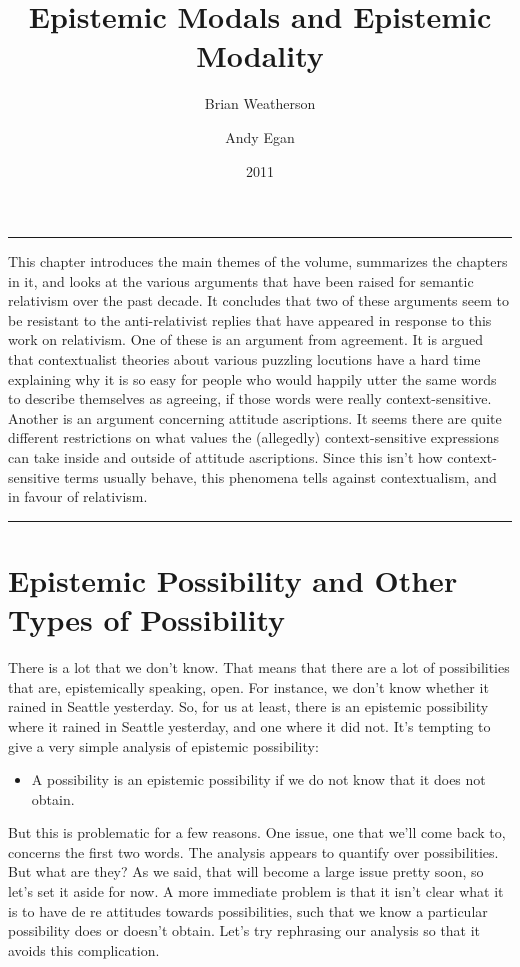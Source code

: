 \documentclass[
  10pt,
  letterpaper,
  DIV=11,
  numbers=noendperiod,
  twoside]{scrartcl}
\title{Epistemic Modals and Epistemic Modality}
\author{Brian Weatherson \and Andy Egan}
\date{2011}
\providecommand{\tightlist}{%
  \setlength{\itemsep}{0pt}\setlength{\parskip}{0pt}}\usepackage{longtable,booktabs,array}
\renewenvironment{abstract}
 {\vspace{-1.25cm}
 \quotation\small\noindent\rule{\linewidth}{.5pt}\par\smallskip
 \noindent }
 {\par\noindent\rule{\linewidth}{.5pt}\endquotation}
\begin{document}
\maketitle
\begin{abstract}
This chapter introduces the main themes of the volume, summarizes the
chapters in it, and looks at the various arguments that have been raised
for semantic relativism over the past decade. It concludes that two of
these arguments seem to be resistant to the anti-relativist replies that
have appeared in response to this work on relativism. One of these is an
argument from agreement. It is argued that contextualist theories about
various puzzling locutions have a hard time explaining why it is so easy
for people who would happily utter the same words to describe themselves
as agreeing, if those words were really context-sensitive. Another is an
argument concerning attitude ascriptions. It seems there are quite
different restrictions on what values the (allegedly) context-sensitive
expressions can take inside and outside of attitude ascriptions. Since
this isn't how context-sensitive terms usually behave, this phenomena
tells against contextualism, and in favour of relativism.
\end{abstract}

\section{Epistemic Possibility and Other Types of
Possibility}\label{epistemic-possibility-and-other-types-of-possibility}

There is a lot that we don't know. That means that there are a lot of
possibilities that are, epistemically speaking, open. For instance, we
don't know whether it rained in Seattle yesterday. So, for us at least,
there is an epistemic possibility where it rained in Seattle yesterday,
and one where it did not. It's tempting to give a very simple analysis
of epistemic possibility:

\begin{itemize}
\tightlist
\item
  A possibility is an epistemic possibility if we do not know that it
  does not obtain.
\end{itemize}

But this is problematic for a few reasons. One issue, one that we'll
come back to, concerns the first two words. The analysis appears to
quantify over possibilities. But what are they? As we said, that will
become a large issue pretty soon, so let's set it aside for now. A more
immediate problem is that it isn't clear what it is to have de re
attitudes towards possibilities, such that we know a particular
possibility does or doesn't obtain. Let's try rephrasing our analysis so
that it avoids this complication.
\end{document}
